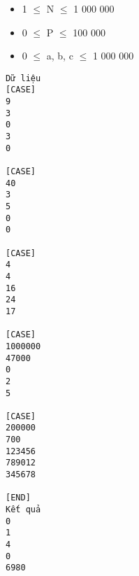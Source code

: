 \begin{itemize}
	\item     1  $\le$  N  $\le$  1 000 000   
	\item     0  $\le$  P  $\le$  100 000   
	\item     0  $\le$  a, b, c  $\le$  1 000 000   
\end{itemize}
\begin{verbatim}
Dữ liệu
[CASE]
9
3
0
3
0

[CASE]
40
3
5
0
0

[CASE]
4
4
16
24
17
    	
[CASE]
1000000
47000
0
2
5

[CASE]
200000
700
123456
789012
345678

[END]
Kết quả
0
1
4
0
6980
\end{verbatim}